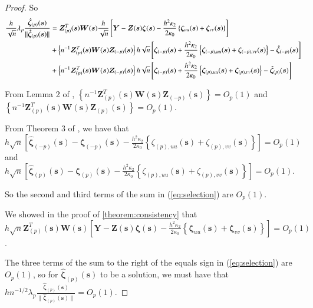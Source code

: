\documentclass[authoryear, review, 11pt]{elsarticle}
\begin{document}
\begin{proof}
            So
            \begin{align}\label{eq:selection}
                \frac{h}{\sqrt{n}} \lambda_p \frac{ \hat{\bm{\zeta}}_{(p)}(\bm{s}) }{\| \hat{\bm{\zeta}}_{(p)}(\bm{s}) \|} &= \bm{Z}_{(p)}^T(\bm{s}) \bm{W}(\bm{s}) \frac{h}{\sqrt{n}} \left[ \bm{Y} - \bm{Z}(\bm{s}) \bm{\zeta}(\bm{s}) - \frac{h^2 \kappa_2}{2 \kappa_0} \left\{ \bm{\zeta}_{uu}(\bm{s}) + \bm{\zeta}_{vv}(\bm{s}) \right\} \right] \notag \\ 
                &+ \left\{ n^{-1}  \bm{Z}_{(p)}^T(\bm{s}) \bm{W}(\bm{s}) \bm{Z}_{(-p)}(\bm{s}) \right\} h \sqrt{n} \left[ \bm{\zeta}_{(-p)}(\bm{s}) + \frac{h^2 \kappa_2}{2 \kappa_0} \left\{ \bm{\zeta}_{(-p),uu}(\bm{s}) + \bm{\zeta}_{(-p),vv}(\bm{s}) \right\} - \hat{\bm{\zeta}}_{(-p)}(\bm{s}) \right] \notag \\
                &+ \left\{ n^{-1} \bm{Z}_{(p)}^T(\bm{s}) \bm{W}(\bm{s}) \bm{Z}_{(-p)}(\bm{s}) \right\} h \sqrt{n} \left[ \bm{\zeta}_{(-p)}(\bm{s}) + \frac{h^2 \kappa_2}{2 \kappa_0} \left\{ \bm{\zeta}_{(p),uu}(\bm{s}) + \bm{\zeta}_{(p),vv}(\bm{s}) \right\} - \hat{\bm{\zeta}}_{(p)}(\bm{s}) \right]
            \end{align}

            From Lemma 2 of \cite{Sun-Yan-Zhang-Lu-2014}, $\left\{ n^{-1} \bm{Z}_{(p)}^T(\bm{s}) \bm{W}(\bm{s}) \bm{Z}_{(-p)}(\bm{s}) \right\} = O_p(1)$ and $\left\{ n^{-1} \bm{Z}_{(p)}^T(\bm{s}) \bm{W}(\bm{s}) \bm{Z}_{(p)}(\bm{s}) \right\} = O_p(1)$.
        
            From Theorem 3 of \cite{Sun-Yan-Zhang-Lu-2014}, we have that $h \sqrt{n} \left[ \hat{\bm{\zeta}}_{(-p)} (\bm{s}) - \bm{\zeta}_{(-p)}(\bm{s}) - \frac{h^2 \kappa_2}{2 \kappa_0} \left\{ \zeta_{(p),uu}(\bm{s}) + \zeta_{(p),vv}(\bm{s}) \right\}\right] = O_p(1)$ and $h \sqrt{n} \left[ \hat{\bm{\zeta}}_{(p)}(\bm{s}) - \bm{\zeta}_{(p)}(\bm{s}) - \frac{h^2 \kappa_2}{2 \kappa_0} \left\{ \zeta_{(p),uu}(\bm{s}) + \zeta_{(p),vv}(\bm{s}) \right\} \right] = O_p(1)$.
        
            So the second and third terms of the sum in (\ref{eq:selection}) are $O_p(1)$.
        
            We showed in the proof of \ref{theorem:consistency} that $h  \sqrt{n} \bm{Z}_{(p)}^T(\bm{s}) \bm{W}(\bm{s}) \left[ \bm{Y} - \bm{Z}(\bm{s}) \bm{\zeta}(\bm{s}) - \frac{h^2 \kappa_2}{2 \kappa_0} \left\{ \bm{\zeta}_{uu}(\bm{s}) + \bm{\zeta}_{vv}(\bm{s}) \right\} \right]= O_p(1)$.

            The three terms of the sum to the right of the equals sign in (\ref{eq:selection}) are $O_p(1)$, so for $\hat{\bm{\zeta}}_{(p)} (\bm{s})$ to be a solution, we must have that $h n^{-1/2} \lambda_p \frac{ \hat{\bm{\zeta}}_{(p)} (\bm{s}) }{\| \hat{\bm{\zeta}}_{(p)} (\bm{s}) \|} = O_p(1)$.


\end{proof}
\end{document}
